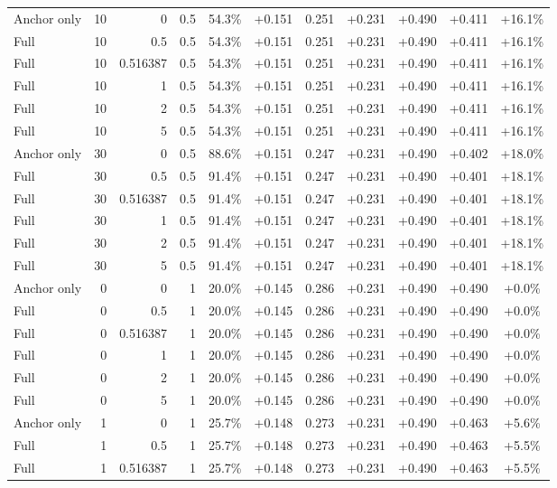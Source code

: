 \begin{table}[htbp]
\begin{tabular}{lrrrccccccc}
Anchor only & 10 & 0 & 0.5 & 54.3\% & +0.151 & 0.251 & +0.231 & +0.490 & +0.411 & +16.1\% \\
Full & 10 & 0.5 & 0.5 & 54.3\% & +0.151 & 0.251 & +0.231 & +0.490 & +0.411 & +16.1\% \\
Full & 10 & 0.516387 & 0.5 & 54.3\% & +0.151 & 0.251 & +0.231 & +0.490 & +0.411 & +16.1\% \\
Full & 10 & 1 & 0.5 & 54.3\% & +0.151 & 0.251 & +0.231 & +0.490 & +0.411 & +16.1\% \\
Full & 10 & 2 & 0.5 & 54.3\% & +0.151 & 0.251 & +0.231 & +0.490 & +0.411 & +16.1\% \\
Full & 10 & 5 & 0.5 & 54.3\% & +0.151 & 0.251 & +0.231 & +0.490 & +0.411 & +16.1\% \\
Anchor only & 30 & 0 & 0.5 & 88.6\% & +0.151 & 0.247 & +0.231 & +0.490 & +0.402 & +18.0\% \\
Full & 30 & 0.5 & 0.5 & 91.4\% & +0.151 & 0.247 & +0.231 & +0.490 & +0.401 & +18.1\% \\
Full & 30 & 0.516387 & 0.5 & 91.4\% & +0.151 & 0.247 & +0.231 & +0.490 & +0.401 & +18.1\% \\
Full & 30 & 1 & 0.5 & 91.4\% & +0.151 & 0.247 & +0.231 & +0.490 & +0.401 & +18.1\% \\
Full & 30 & 2 & 0.5 & 91.4\% & +0.151 & 0.247 & +0.231 & +0.490 & +0.401 & +18.1\% \\
Full & 30 & 5 & 0.5 & 91.4\% & +0.151 & 0.247 & +0.231 & +0.490 & +0.401 & +18.1\% \\
Anchor only & 0 & 0 & 1 & 20.0\% & +0.145 & 0.286 & +0.231 & +0.490 & +0.490 & +0.0\% \\
Full & 0 & 0.5 & 1 & 20.0\% & +0.145 & 0.286 & +0.231 & +0.490 & +0.490 & +0.0\% \\
Full & 0 & 0.516387 & 1 & 20.0\% & +0.145 & 0.286 & +0.231 & +0.490 & +0.490 & +0.0\% \\
Full & 0 & 1 & 1 & 20.0\% & +0.145 & 0.286 & +0.231 & +0.490 & +0.490 & +0.0\% \\
Full & 0 & 2 & 1 & 20.0\% & +0.145 & 0.286 & +0.231 & +0.490 & +0.490 & +0.0\% \\
Full & 0 & 5 & 1 & 20.0\% & +0.145 & 0.286 & +0.231 & +0.490 & +0.490 & +0.0\% \\
Anchor only & 1 & 0 & 1 & 25.7\% & +0.148 & 0.273 & +0.231 & +0.490 & +0.463 & +5.6\% \\
Full & 1 & 0.5 & 1 & 25.7\% & +0.148 & 0.273 & +0.231 & +0.490 & +0.463 & +5.5\% \\
Full & 1 & 0.516387 & 1 & 25.7\% & +0.148 & 0.273 & +0.231 & +0.490 & +0.463 & +5.5\% \\

\end{tabular}
\end{table}
